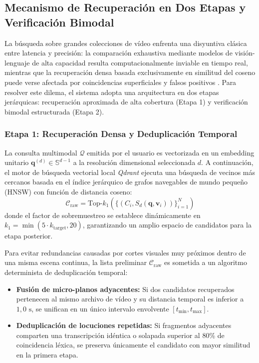 \subsection{Mecanismo de Recuperación en Dos Etapas y Verificación Bimodal}
\label{subsec:recuperacion_dos_etapas}

La búsqueda sobre grandes colecciones de vídeo enfrenta una disyuntiva clásica entre latencia y precisión: la comparación exhaustiva mediante modelos de visión-lenguaje de alta capacidad resulta computacionalmente inviable en tiempo real, mientras que la recuperación densa basada exclusivamente en similitud del coseno puede verse afectada por coincidencias superficiales y falsos positivos \cite{video_rag2024, eval_mrag2025}. Para resolver este dilema, el sistema adopta una arquitectura en dos etapas jerárquicas: recuperación aproximada de alta cobertura (Etapa 1) y verificación bimodal estructurada (Etapa 2).

\subsubsection{Etapa 1: Recuperación Densa y Deduplicación Temporal}
La consulta multimodal $\mathcal{Q}$ emitida por el usuario es vectorizada en un embedding unitario $\mathbf{q}^{(d)} \in \mathbb{S}^{d-1}$ a la resolución dimensional seleccionada $d$. A continuación, el motor de búsqueda vectorial local \textit{Qdrant} ejecuta una búsqueda de vecinos más cercanos basada en el índice jerárquico de grafos navegables de mundo pequeño (HNSW) \cite{malkov2020hnsw} con función de distancia coseno:
\begin{equation}
    \mathcal{C}_{\text{raw}} = \text{Top-}k_1 \left( \{ (C_i, S_d(\mathbf{q}, \mathbf{v}_i)) \}_{i=1}^N \right)
\end{equation}
donde el factor de sobremuestreo se establece dinámicamente en $k_1 = \min(5 \cdot k_{\text{target}}, 20)$, garantizando un amplio espacio de candidatos para la etapa posterior.

Para evitar redundancias causadas por cortes visuales muy próximos dentro de una misma escena continua, la lista preliminar $\mathcal{C}_{\text{raw}}$ es sometida a un algoritmo determinista de deduplicación temporal:
\begin{itemize}
    \item \textbf{Fusión de micro-planos adyacentes:} Si dos candidatos recuperados pertenecen al mismo archivo de vídeo y su distancia temporal es inferior a $1,0\text{ s}$, se unifican en un único intervalo envolvente $[t_{\min}, t_{\max}]$.
    \item \textbf{Deduplicación de locuciones repetidas:} Si fragmentos adyacentes comparten una transcripción idéntica o solapada superior al 80\% de coincidencia léxica, se preserva únicamente el candidato con mayor similitud en la primera etapa.
\end{itemize}

